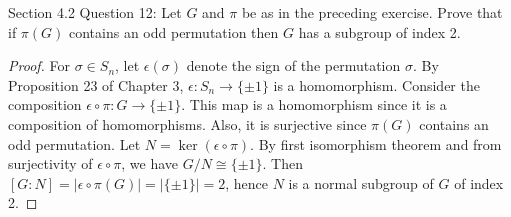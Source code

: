 Section 4.2 Question 12:
Let $G$ and $\pi$ be as in the preceding exercise. Prove that if $\pi(G)$
contains an odd permutation then $G$ has a subgroup of index 2.

\begin{proof}
  For $\sigma\in S_n$, let $\epsilon(\sigma)$ denote the sign of the
  permutation $\sigma$. By Proposition 23 of Chapter 3,
  $\epsilon:S_n\rightarrow\{\pm1\}$ is a homomorphism. Consider the
  composition $\epsilon\circ\pi:G\rightarrow\{\pm1\}$. This map is a
  homomorphism since it is a composition of homomorphisms. Also, it is
  surjective since $\pi(G)$ contains an odd permutation. Let
  $N=\ker(\epsilon\circ\pi)$. By first isomorphism theorem and from
  surjectivity of $\epsilon\circ\pi$, we have $G/N\cong\{\pm1\}$. Then
  $[G:N]=|\epsilon\circ\pi(G)|=|\{\pm1\}|=2$, hence $N$ is a normal
  subgroup of $G$ of index 2.
\end{proof}
